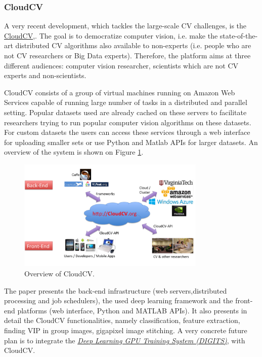 \subsubsection{CloudCV}
A very recent development, which tackles the large-scale CV challenges, is the \href{http://cloudcv.org/}{CloudCV},\cite{AgrawalMGCBMOB15}. The goal is to democratize computer vision, i.e. make the state-of-the-art distributed CV algorithms also available to non-experts (i.e. people who are not CV researchers or Big Data experts). Therefore, the platform aims at three different audiences: computer vision researcher, scientists which are not CV experts and non-scientists. 

CloudCV consists of a group of virtual machines running on Amazon
Web Services capable of running large number of tasks in a distributed and parallel
setting. Popular datasets used are already cached on these servers to facilitate researchers
trying to run popular computer vision algorithms on these datasets. For custom datasets the users
can access these services through a web interface for uploading smaller sets or use Python and Matlab APIs for larger datasets. An overview of the system is shown on Figure \ref{fig:cloudcv}.

\begin{figure}[H]
\begin{center}
\includegraphics[width=0.8\textwidth]{fig/CloudCV}
\end{center}
\caption{Overview of CloudCV.}
\label{fig:cloudcv}
\end{figure}

The paper presents the back-end infrastructure (web servers,distributed processing and job schedulers), the used deep learning framework and the front-end platforms (web interface, Python and MATLAB APIs). It also presents in detail the CloudCV functionalities, namely classification, feature extraction, finding VIP in group images, gigapixel image stitching. A very concrete future plan is to integrate the \href{https://developer.nvidia.com/digits}{\em Deep Learning GPU Training System (DIGITS)}, \cite{digits_soft} with CloudCV. 